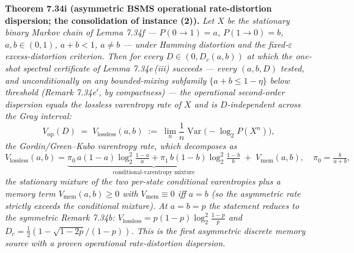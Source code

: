 \documentclass[
]{article}
\begin{document}
\textbf{Theorem 7.34i (asymmetric BSMS operational rate-distortion dispersion;
the consolidation of instance (2)).} \emph{Let $X$ be the stationary binary
Markov chain of Lemma 7.34f --- $P(0\!\to\!1)=a$, $P(1\!\to\!0)=b$,
$a,b\in(0,1)$, $a+b<1$, $a\ne b$ --- under Hamming distortion and the
fixed-$\varepsilon$ excess-distortion criterion. Then for every
$D\in(0,D_c(a,b))$ at which the one-shot spectral certificate of
Lemma 7.34e\,(iii) succeeds --- every $(a,b,D)$ tested, and unconditionally on
any bounded-mixing subfamily $\{a+b\le1-\eta\}$ below threshold (Remark
7.34e$'$, by compactness) --- the operational second-order dispersion equals
the lossless varentropy rate of $X$ and is $D$-independent across the Gray
interval:}
\[
  V_{\mathrm{op}}(D)\;=\;V_{\mathrm{lossless}}(a,b)
  \;:=\;\lim_{n}\frac1n\operatorname{Var}\bigl(-\log_2 P(X^n)\bigr),
\]
\emph{the Gordin/Green--Kubo varentropy rate, which decomposes as}
\[
  V_{\mathrm{lossless}}(a,b)=\underbrace{\pi_0\,a(1-a)\log_2^2\tfrac{1-a}{a}
  +\pi_1\,b(1-b)\log_2^2\tfrac{1-b}{b}}_{\text{conditional-varentropy mixture}}
  \;+\;V_{\mathrm{mem}}(a,b),\quad \pi_0=\tfrac b{a+b},
\]
\emph{the stationary mixture of the two per-state conditional varentropies plus
a memory term $V_{\mathrm{mem}}(a,b)\ge0$ with $V_{\mathrm{mem}}\equiv0$ iff
$a=b$ (so the asymmetric rate strictly exceeds the conditional mixture). At
$a=b=p$ the statement reduces to the symmetric Remark 7.34b:
$V_{\mathrm{lossless}}=p(1-p)\log_2^2\tfrac{1-p}p$ and
$D_c=\tfrac12(1-\sqrt{1-2p}/(1-p))$. This is the first \emph{asymmetric}
discrete memory source with a proven operational rate-distortion dispersion.}
\end{document}
